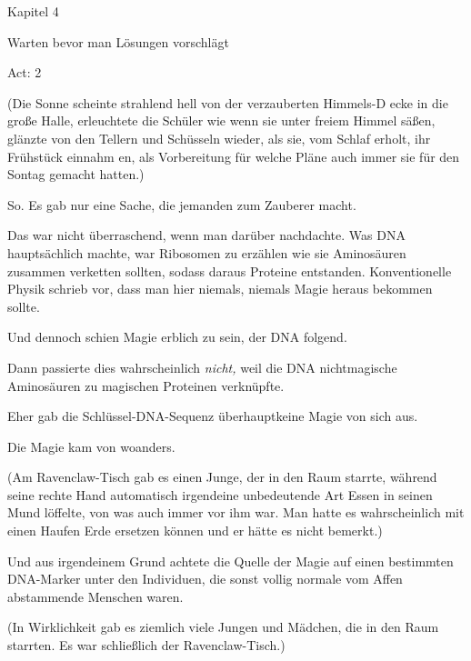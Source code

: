 

\hypertarget{warten-bevor-man-luxf6sungen-vorschluxe4gt}{%

Kapitel 4

Warten bevor man Lösungen vorschlägt

Act: 2

(Die Sonne scheinte strahlend hell von der verzauberten Himmels-D ecke in die große Halle, erleuchtete die Schüler wie wenn sie unter freiem Himmel säßen, glänzte von den Tellern und Schüsseln wieder, als sie, vom Schlaf erholt, ihr Frühstück einnahm en, als Vorbereitung für welche Pläne auch immer sie für den Sontag gemacht hatten.)

So. Es gab nur eine Sache, die jemanden zum Zauberer macht.

Das war nicht überraschend, wenn man darüber nachdachte. Was DNA hauptsächlich machte, war Ribosomen zu erzählen wie sie Aminosäuren zusammen verketten sollten, sodass daraus Proteine entstanden. Konventionelle Physik schrieb vor, dass man hier niemals, niemals Magie heraus bekommen sollte.

Und dennoch schien Magie erblich zu sein, der DNA folgend.

Dann passierte dies wahrscheinlich \emph{nicht,} weil die DNA nichtmagische Aminosäuren zu magischen Proteinen verknüpfte.

Eher gab die Schlüssel-DNA-Sequenz überhauptkeine Magie von sich aus.

Die Magie kam von woanders.

(Am Ravenclaw-Tisch gab es einen Junge, der in den Raum starrte, während seine rechte Hand automatisch irgendeine unbedeutende Art Essen in seinen Mund löffelte, von was auch immer vor ihm war. Man hatte es wahrscheinlich mit einen Haufen Erde ersetzen können und er hätte es nicht bemerkt.)

Und aus irgendeinem Grund achtete die Quelle der Magie auf einen bestimmten DNA-Marker unter den Individuen, die sonst vollig normale vom Affen abstammende Menschen waren.

(In Wirklichkeit gab es ziemlich viele Jungen und Mädchen, die in den Raum starrten. Es war schließlich der Ravenclaw-Tisch.)

}
